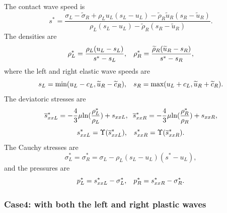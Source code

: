 \documentclass{article}
\numberwithin{equation}{section}
\numberwithin{table}{section}
\begin{document}
The contact wave speed is
\begin{equation}
  s^* = \frac{\sigma_L-\widetilde{\sigma}_R+\rho_L u_L(s_L-u_L)-\widetilde{\rho}_R \widetilde{u}_R(s_R-\widetilde{u}_R)}{\rho_L(s_L-u_L)-\widetilde{\rho}_R(s_R-\widetilde{u}_R)}.
\end{equation}
The densities are
\begin{equation}\label{eq:rhoLs}
  \rho_L^* = \frac{\rho_L(u_L-s_L)}{s^*-s_L}, \hspace{0.3cm}  \rho_R^* = \frac{\widetilde{\rho}_R(\widetilde{u}_R-s_R)}{s^*-s_R},
\end{equation}
where the left and right elastic wave speeds are
	\begin{equation}
	  s_L = \text{min} (u_L-c_L, \widetilde{u}_R-\widetilde{c}_R), \hspace{0.3cm} s_R = \text{max}(u_L+c_L, \widetilde{u}_R+\widetilde{c}_R).
	\end{equation}
	The deviatoric stresses are
\begin{equation}
  \overline{s}_{xxL}^*=-\frac{4}{3}\mu\text{ln}(\frac{\rho_L^*}{\rho_L})+s_{xxL},\hspace{0.2cm}  \overline{s}_{xxR}^*=-\frac{4}{3}\mu\text{ln}(\frac{\rho_R^*}{\rho_R})+s_{xxR},
\end{equation}
\begin{equation}
  s_{xxL}^* = \Upsilon(\overline{s}_{xxL}^*), \hspace{0.3cm}  s_{xxR}^* = \Upsilon(\overline{s}_{xxR}^*).
\end{equation}
The Cauchy stresses are
\begin{equation}
  \sigma_L^*=\sigma_R^*=\sigma_L -\rho_L (s_L-u_L)(s^*-u_L),
\end{equation}
and the pressures are
\begin{equation}
  p_L^* = s_{xxL}^* - \sigma_L^*, \hspace{0.3cm}   p_R^* = s_{xxR}^* - \sigma_R^*.
\end{equation}



\subsubsection{Case4: with both the left and right plastic waves}
\end{document}
